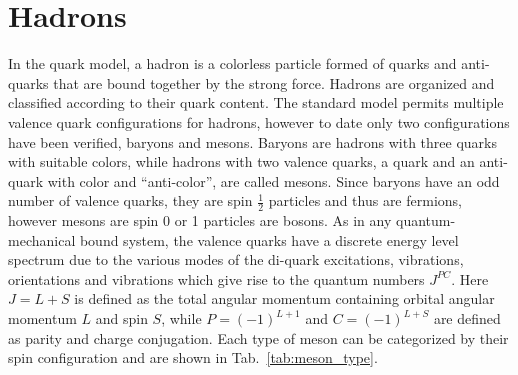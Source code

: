 \section{Hadrons}
In the quark model, a hadron is a colorless particle formed of quarks and anti-quarks that are bound together by the strong force. Hadrons are organized and classified according to their quark content. The standard model permits multiple valence quark configurations for hadrons, however to date only two configurations have been verified, baryons and mesons. Baryons are hadrons with three quarks with suitable colors, while hadrons with two valence quarks, a quark and an anti-quark with color and ``anti-color'', are called mesons. Since baryons have an odd number of valence quarks, they are spin $\frac{1}{2}$ particles and thus are fermions, however mesons are spin 0 or 1 particles are bosons. As in any quantum-mechanical bound system, the valence quarks have a discrete energy level spectrum due to the various modes of the di-quark excitations, vibrations, orientations and vibrations which give rise to the quantum numbers $J^{PC}$. Here $J=L+S$ is defined as the total angular momentum containing orbital angular momentum $L$ and spin $S$, while $P=(-1)^{L+1}$ and $C= (-1)^{L+S}$ are defined as parity and charge conjugation.
% 
% 
% 
Each type of meson can be categorized by their spin configuration and are shown in Tab.~\ref{tab:meson_type}.

\FloatBarrier
